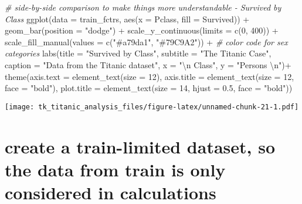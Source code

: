 \documentclass[
]{article}
\newenvironment{Shaded}{\begin{snugshade}}{\end{snugshade}}
\newcommand{\AttributeTok}[1]{\textcolor[rgb]{0.77,0.63,0.00}{#1}}
\newcommand{\CommentTok}[1]{\textcolor[rgb]{0.56,0.35,0.01}{\textit{#1}}}
\newcommand{\DecValTok}[1]{\textcolor[rgb]{0.00,0.00,0.81}{#1}}
\newcommand{\FloatTok}[1]{\textcolor[rgb]{0.00,0.00,0.81}{#1}}
\newcommand{\FunctionTok}[1]{\textcolor[rgb]{0.00,0.00,0.00}{#1}}
\newcommand{\NormalTok}[1]{#1}
\newcommand{\SpecialCharTok}[1]{\textcolor[rgb]{0.00,0.00,0.00}{#1}}
\newcommand{\StringTok}[1]{\textcolor[rgb]{0.31,0.60,0.02}{#1}}
\begin{document}
\begin{Shaded}
\begin{Highlighting}[]
\CommentTok{\# side{-}by{-}side comparison to make things more understandable {-} Survived by Class}
\FunctionTok{ggplot}\NormalTok{(}\AttributeTok{data =}\NormalTok{ train\_fctrs, }\FunctionTok{aes}\NormalTok{(}\AttributeTok{x =}\NormalTok{ Pclass, }\AttributeTok{fill =}\NormalTok{ Survived)) }\SpecialCharTok{+} \FunctionTok{geom\_bar}\NormalTok{(}\AttributeTok{position =} \StringTok{"dodge"}\NormalTok{) }\SpecialCharTok{+}
  \FunctionTok{scale\_y\_continuous}\NormalTok{(}\AttributeTok{limits =} \FunctionTok{c}\NormalTok{(}\DecValTok{0}\NormalTok{, }\DecValTok{400}\NormalTok{)) }\SpecialCharTok{+}
  \FunctionTok{scale\_fill\_manual}\NormalTok{(}\AttributeTok{values =} \FunctionTok{c}\NormalTok{(}\StringTok{"\#a79da1"}\NormalTok{, }\StringTok{"\#79C9A2"}\NormalTok{)) }\SpecialCharTok{+}   \CommentTok{\# color code for sex categories}
  \FunctionTok{labs}\NormalTok{(}\AttributeTok{title =} \StringTok{"Survived by Class"}\NormalTok{, }
       \AttributeTok{subtitle =} \StringTok{"The Titanic Case"}\NormalTok{,}
       \AttributeTok{caption =} \StringTok{"Data from the Titanic dataset"}\NormalTok{, }
       \AttributeTok{x =} \StringTok{"}\SpecialCharTok{\textbackslash{}n}\StringTok{ Class"}\NormalTok{, }\AttributeTok{y =} \StringTok{"Persons }\SpecialCharTok{\textbackslash{}n}\StringTok{"}\NormalTok{)}\SpecialCharTok{+} 
  \FunctionTok{theme}\NormalTok{(}\AttributeTok{axis.text =} \FunctionTok{element\_text}\NormalTok{(}\AttributeTok{size =} \DecValTok{12}\NormalTok{), }
        \AttributeTok{axis.title =} \FunctionTok{element\_text}\NormalTok{(}\AttributeTok{size =} \DecValTok{12}\NormalTok{, }\AttributeTok{face =} \StringTok{"bold"}\NormalTok{), }
        \AttributeTok{plot.title =} \FunctionTok{element\_text}\NormalTok{(}\AttributeTok{size =} \DecValTok{14}\NormalTok{, }\AttributeTok{hjust =} \FloatTok{0.5}\NormalTok{, }\AttributeTok{face =} \StringTok{"bold"}\NormalTok{))}
\end{Highlighting}
\end{Shaded}

\texttt{[image: tk\_titanic\_analysis\_files/figure-latex/unnamed-chunk-21-1.pdf]}

\hypertarget{create-a-train-limited-dataset-so-the-data-from-train-is-only-considered-in-calculations}{%
\section{create a train-limited dataset, so the data from train is only
considered in
calculations}\label{create-a-train-limited-dataset-so-the-data-from-train-is-only-considered-in-calculations}}
\end{document}
